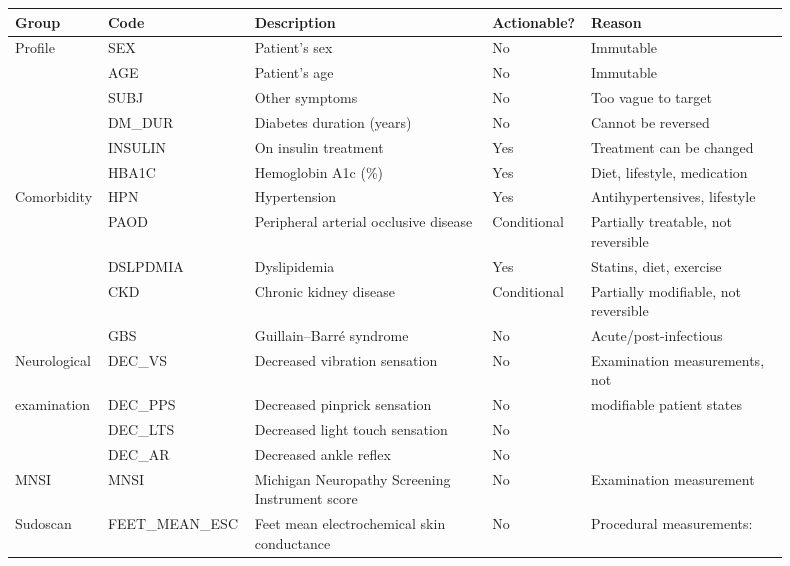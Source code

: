 \documentclass[pdflatex,sn-mathphys-num]{sn-jnl}%
\theoremstyle{thmstyleone}%
\theoremstyle{thmstyletwo}%
\theoremstyle{thmstylethree}%
\begin{document}
\begin{table}[tbp]
    \centering
    \footnotesize
    \begin{tabular}{@{}p{0.10\linewidth} p{0.15\linewidth} p{0.30\linewidth} p{0.10\linewidth} p{0.25\linewidth}@{}}
        \toprule
        \textbf{Group} & \textbf{Code} & \textbf{Description} & \textbf{Actionable?} & \textbf{Reason} \\
        \midrule
        Profile & SEX & Patient's sex & No & Immutable \\
                & AGE & Patient's age & No & Immutable \\
                & SUBJ & Other symptoms & No & Too vague to target \\
                & DM\_DUR & Diabetes duration (years) & No & Cannot be reversed \\
                & INSULIN & On insulin treatment & Yes & Treatment can be changed \\
                & HBA1C & Hemoglobin A1c (\%) & Yes & Diet, lifestyle, medication \\
        \midrule
        Comorbidity & HPN & Hypertension & Yes & Antihypertensives, lifestyle \\
                & PAOD & Peripheral arterial occlusive disease & Conditional & Partially treatable, not reversible \\
                & DSLPDMIA & Dyslipidemia & Yes & Statins, diet, exercise \\
                & CKD & Chronic kidney disease & Conditional & Partially modifiable, not reversible \\
                & GBS & Guillain--Barr\'e syndrome & No & Acute/post-infectious \\
        \midrule
        Neurological & DEC\_VS & Decreased vibration sensation & No & Examination measurements, not \\
        examination & DEC\_PPS & Decreased pinprick sensation & No & modifiable patient states \\
                & DEC\_LTS & Decreased light touch sensation & No & \\
                & DEC\_AR & Decreased ankle reflex & No & \\
        \midrule
        MNSI & MNSI & Michigan Neuropathy Screening Instrument score & No & Examination measurement \\
        \midrule
        Sudoscan & FEET\_MEAN\_ESC & Feet mean electrochemical skin conductance & No & Procedural measurements: \\

\end{tabular}
\end{table}
\end{document}
